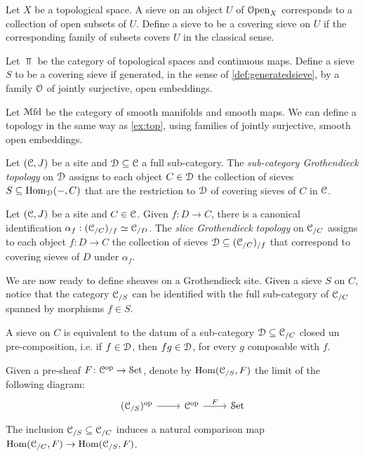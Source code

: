 \documentclass[10pt]{amsart}
\begin{document}
	\begin{example}
		Let $X$ be a topological space. A sieve on an object $U$ of $\mathcal{O}\mathrm{pen}_X$ corresponds to a collection of open subsets of $U$. Define a sieve to be a covering sieve on $U$ if the corresponding family of subsets covers $U$ in the classical sense.
	\end{example}
	\begin{example}\label{ex:top}
		Let $\Top$ be the category of topological spaces and continuous maps. Define a sieve $S$ to be a covering sieve if generated, in the sense of \cref{def:generatedsieve}, by a family $\mathcal{O}$ of jointly surjective, open embeddings. 
	\end{example}
	\begin{example}Let $\mathcal{M}\mathrm{fd}$ be the category of smooth manifolds and smooth maps. We can define a topology in the same way as \cref{ex:top}, using families of jointly surjective, smooth open embeddings. 
	\end{example}
	\begin{definition}\label{def:indtop}
		Let $(\mathcal{C},J)$ be a site and $\mathcal{D}\subseteq\mathcal{C}$ a full sub-category. The \emph{sub-category Grothendieck topology} on $\mathcal{D}$ assigns to each object $C\in\mathcal{D}$ the collection of sieves $S\subseteq\mathrm{Hom}_{\mathcal{D}}(-,C)$ that are the restriction to $\mathcal{D}$ of covering sieves of $C$ in $\mathcal{C}$.
	\end{definition}
	\begin{definition}\label{def:slicetop}
		Let $(\mathcal{C},J)$ be a site and $C\in\mathcal{C}$. Given $f:D\to C$, there is a canonical identification $\alpha_f:(\mathcal{C}_{/C})_{/f}\simeq\mathcal{C}_{/D}$. The \emph{slice Grothendieck topology} on $\mathcal{C}_{/C}$ assigns to each object $f:D\to C$ the collection of sieves $\mathcal{D}\subseteq(\mathcal{C}_{/C})_{/f}$ that correspond to covering sieves of $D$ under $\alpha_f$. 
	\end{definition}
	We are now ready to define sheaves on a Grothendieck site. Given a sieve $S$ on $C$, notice that the category $\mathcal{C}_{/S}$ can be identified with the full sub-category of $\mathcal{C}_{/C}$ spanned by morphisms $f\in S$.
	\begin{remark}
		A sieve on $C$ is equivalent to the datum of a sub-category $\mathcal{D}\subseteq\mathcal{C}_{/C}$ closed un pre-composition, i.e. if $f\in\mathcal{D}$, then $fg\in\mathcal{D}$, for every $g$ composable with $f$. 
	\end{remark} 
	\begin{definition}\label{map}
		Given a pre-sheaf $F\colon \mathcal{C}^{\mathrm{op}}\to\mathcal{S}\mathrm{et}$, denote by $\mathrm{Hom}(\mathcal{C}_{/S},F)$ the limit of the following diagram:
	\begin{equation}\label{eq:comparison}
		\begin{tikzcd}
			(\lC_{/S})^{\op}\arrow[r] & \lC^{\op}\arrow[r,"F"] & \set
		\end{tikzcd}
	\end{equation}The inclusion $\mathcal{C}_{/S}\subseteq\mathcal{C}_{/C}$ induces a natural \textnormal{comparison map} $\mathrm{Hom}(\mathcal{C}_{/C},F)\to\mathrm{Hom}(\mathcal{C}_{/S},F)$.
	\end{definition}
\end{document}
